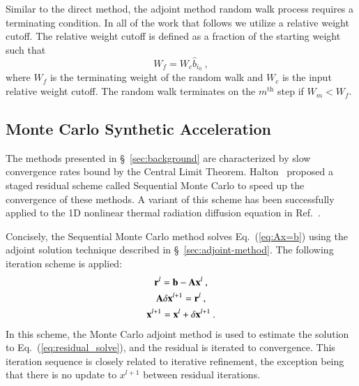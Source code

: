 \documentclass[preprint,12pt]{elsarticle}
\newcommand{\vA}{\ensuremath{\ve{A}}}
\newcommand{\vb}{\ensuremath{\ve{b}}}
\newcommand{\vx}{\ensuremath{\ve{x}}}
\newcommand{\vr}{\ensuremath{\ve{r}}}
\begin{document}
Similar to the direct method, the adjoint method random walk process
requires a terminating condition.  In all of the work that follows we
utilize a relative weight cutoff.  The relative weight cutoff is
defined as a fraction of the starting weight such that
\begin{equation}
  W_f = W_c\hat{b}_{i_0}\:,
  \label{eq:weight_cutoff}
\end{equation}
where $W_f$ is the terminating weight of the random walk and $W_c$ is
the input relative weight cutoff. The random walk terminates on the
$m^\text{th}$ step if $W_m < W_f$.

\subsection{Monte Carlo Synthetic Acceleration}
\label{sec:iter-refin-monte}

The methods presented in \S~\ref{sec:background} are characterized by slow
convergence rates bound by the Central Limit Theorem.
Halton~\cite{halton_1962,halton_1994} proposed a staged residual scheme called
Sequential Monte Carlo to speed up the convergence of these methods.  A
variant of this scheme has been successfully applied to the 1D nonlinear
thermal radiation diffusion equation in Ref.~\cite{evans_2003}.

Concisely, the Sequential Monte Carlo method solves Eq.~(\ref{eq:Ax=b}) using
the adjoint solution technique described in \S~\ref{sec:adjoint-method}.  The
following iteration scheme is applied:
\begin{subequations}
  \begin{gather}
    \vr^{l} = \vb - \vA\vx^{l}\:, \\ \vA\delta\vx^{l+1} =
    \vr^{l}\:, \label{eq:residual_solve}\\ \vx^{l+1} = \vx^{l} +
    \delta\vx^{l+1}\:.
  \end{gather}
\end{subequations}
In this scheme, the Monte Carlo adjoint method is used to estimate the
solution to Eq.~(\ref{eq:residual_solve}), and the residual is iterated to
convergence.  This iteration sequence is closely related to iterative
refinement, the exception being that there is no update to $x^{l+1}$ between
residual iterations.
\end{document}
